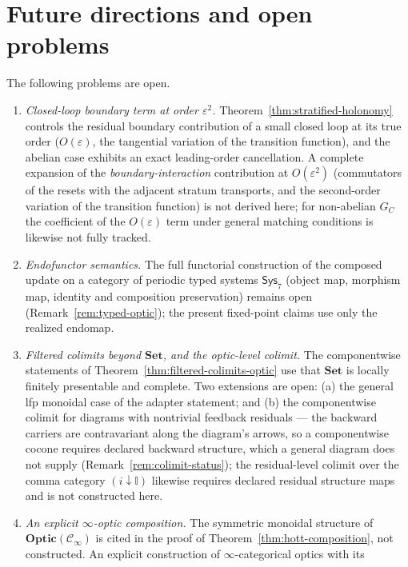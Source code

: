 \documentclass[11pt,a4paper]{article}
\theoremstyle{plain}
\theoremstyle{definition}
\theoremstyle{remark}
\newcommand{\Optic}{\mathbf{Optic}}
\begin{document}
\section{Future directions and open problems}\label{sec:future}

The following problems are open.

\begin{enumerate}[leftmargin=*,itemsep=3pt]
\item \emph{Closed-loop boundary term at order $\varepsilon^2$.}
Theorem~\ref{thm:stratified-holonomy} controls the residual boundary
contribution of a small closed loop at its true order
($O(\varepsilon)$, the tangential variation of the transition
function), and the abelian case exhibits an exact leading-order
cancellation. A complete expansion of the
\emph{boundary-interaction} contribution at $O(\varepsilon^2)$
(commutators of the resets with the adjacent stratum transports, and
the second-order variation of the transition function) is not
derived here; for non-abelian $G_C$ the coefficient of the
$O(\varepsilon)$ term under general matching conditions is likewise
not fully tracked.
\item \emph{Endofunctor semantics.} The full functorial construction
of the composed update on a category of periodic typed systems
$\mathsf{Sys}_7$ (object map, morphism map, identity and composition
preservation) remains open
(Remark~\ref{rem:typed-optic}); the present fixed-point claims use
only the realized endomap.
\item \emph{Filtered colimits beyond $\mathbf{Set}$, and the
optic-level colimit.} The componentwise statements of
Theorem~\ref{thm:filtered-colimits-optic} use that $\mathbf{Set}$ is
locally finitely presentable and complete. Two extensions are open:
(a) the general lfp monoidal case of the adapter statement; and
(b) the componentwise colimit for diagrams with nontrivial feedback
residuals --- the backward carriers are contravariant along the
diagram's arrows, so a componentwise cocone requires declared
backward structure, which a general diagram does not supply
(Remark~\ref{rem:colimit-status}); the residual-level colimit over
the comma category $(i\downarrow\mathbb I)$ likewise requires
declared residual structure maps and is not constructed here.
\item \emph{An explicit $\infty$-optic composition.} The symmetric
monoidal structure of $\Optic(\mathcal{C}_\infty)$ is cited in the
proof of Theorem~\ref{thm:hott-composition}, not constructed. An
explicit construction of $\infty$-categorical optics with its

\end{enumerate}
\end{document}
